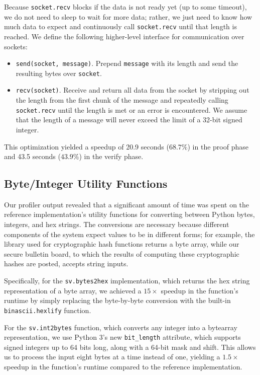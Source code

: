 Because \texttt{socket.recv} blocks if the data is not ready yet (up to some timeout), we do not need to sleep to wait for more data; rather, we just need to know how much data to expect and continuously call \texttt{socket.recv} until that length is reached. We define the following higher-level interface for communication over sockets:
\begin{itemize}
\item \texttt{send(socket, message)}. Prepend \texttt{message} with its length and send the resulting bytes over \texttt{socket}.
\item \texttt{recv(socket)}. Receive and return all data from the socket by stripping out the length from the first chunk of the message and repeatedly calling \texttt{socket.recv} until the length is met or an error is encountered. We assume that the length of a message will never exceed the limit of a 32-bit signed integer.
\end{itemize}

This optimization yielded a speedup of 20.9 seconds ($68.7\%$) in the proof phase and 43.5 seconds ($43.9\%$) in the verify phase.

\subsection{Byte/Integer Utility Functions} \label{perf:optimizations:byteint}

Our profiler output revealed that a significant amount of time was spent on the reference implementation's utility functions for converting between Python bytes, integers, and hex strings. The conversions are necessary because different components of the system expect values to be in different forms; for example, the library used for cryptographic hash functions returns a byte array, while our secure bulletin board, to which the results of computing these cryptographic hashes are posted, accepts string inputs.

Specifically, for the \texttt{sv.bytes2hex} implementation, which returns the hex string representation of a byte array, we achieved a $15 \times$ speedup in the function's runtime by simply replacing the byte-by-byte conversion with the built-in \texttt{binascii.hexlify} function.

For the \texttt{sv.int2bytes} function, which converts any integer into a bytearray representation, we use Python 3's new \texttt{bit\_length} attribute, which supports signed integers up to 64 bits long, along with a 64-bit mask and shift. This allows us to process the input eight bytes at a time instead of one, yielding a $1.5 \times$ speedup in the function's runtime compared to the reference implementation.

